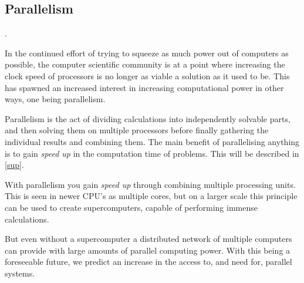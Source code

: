 

\subsection{Parallelism}\cite{parallel programming languages}.

In the continued effort of trying to squeeze as much power out of computers as possible, the computer scientific community is at a point where increasing the clock speed of processors is no longer as viable a solution as it used to be. This has spawned an increased interest in increasing computational power in other ways, one being parallelism.

Parallelism is the act of dividing calculations into independently solvable parts, and then solving them on multiple processors before finally gathering the individual results and combining them. The main benefit of parallelising anything is to gain \emph{speed up} in the computation time of problems. This will be described in \cref{sup}.

With parallelism you gain \emph{speed up} through combining multiple processing units. This is seen in newer CPU's as multiple cores, but on a larger scale this principle can be used to create supercomputers, capable of performing immense calculations.

But even without a supercomputer a distributed network of multiple computers can provide with large amounts of parallel computing power. With this being a foreseeable future, we predict an increase in the access to, and need for, parallel systems.